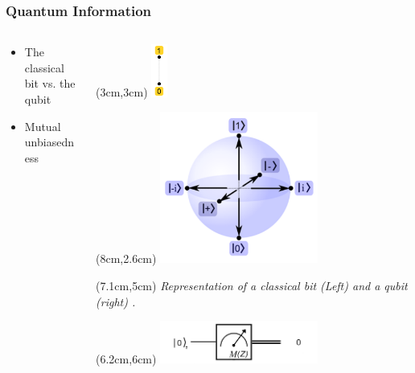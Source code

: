 \documentclass[]{beamer}
\begin{document}
\begin{frame}
	\frametitle{Quantum Information}
	\begin{columns}
		\begin{column}{0.5\textwidth}
		\begin{itemize}
			\item The classical bit vs. the qubit
			\vspace{2cm}
			\item Mutual unbiasedness
		\end{itemize}
		\end{column}
		\begin{column}{0.5\textwidth}  %
			\begin{center}
				\begin{textblock*}{10cm}(3cm,3cm)
				\includegraphics[width=0.05\textwidth]{ClassicalBit.png}
				\end{textblock*}
				\begin{textblock*}{5cm}(8cm,2.6cm)
				\includegraphics[width=0.5\textwidth]{QuantumBit.png}
				\end{textblock*}
				\begin{textblock*}{5cm}(7.1cm,5cm)
				\tiny	\textit{Representation of a classical bit (Left) and a qubit (right) \cite{Pomorski2018}.}
				\end{textblock*}
				\begin{textblock*}{7cm}(6.2cm,6cm)
					\includegraphics[width=0.5\textwidth]{MeasureInZ.png}

\end{textblock*}
\end{center}
\end{column}
\end{columns}
\end{frame}
\end{document}
